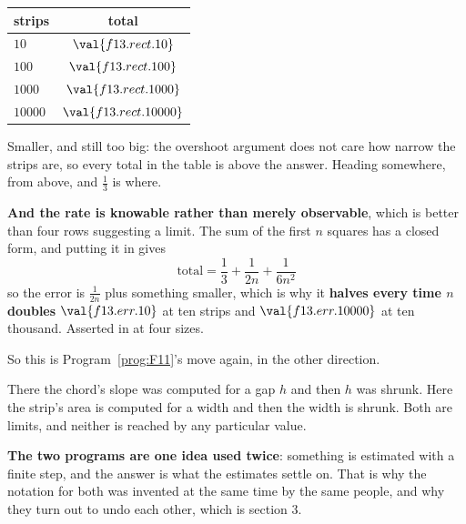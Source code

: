 \begin{fr}
\begin{ansblock}
\begin{center}
%
\begin{tabular}{lc}
\toprule
strips & total \\
\midrule
$\num{10}$ & $\val{f13.rect.10}$ \\
$\num{100}$ & $\val{f13.rect.100}$ \\
$\num{1000}$ & $\val{f13.rect.1000}$ \\
$\num{10000}$ & $\val{f13.rect.10000}$ \\
\bottomrule
\end{tabular}
\end{center}
\end{ansblock}

Smaller, and still too big: the overshoot argument does not care how narrow
the strips are, so every total in the table is above the answer. Heading
somewhere, from above, and $\frac{1}{3}$ is where.

\textbf{And the rate is knowable rather than merely observable}, which is
better than four rows suggesting a limit. The sum of the first $n$ squares has
a closed form, and putting it in gives
\[ \text{total} = \frac{1}{3} + \frac{1}{2n} + \frac{1}{6n^{2}} \]
so the error is $\frac{1}{2n}$ plus something smaller, which is why it
\textbf{halves every time $n$ doubles} \dash{} $\val{f13.err.10}$ at ten strips and
$\val{f13.err.10000}$ at ten thousand. Asserted in
 at four sizes.

\end{fr}

\begin{fr}
So this is Program~\ref{prog:F11}'s move again, in the other direction.

There the chord's slope was computed for a gap $h$ and then $h$ was shrunk.
Here the strip's area is computed for a width and then the width is shrunk.
Both are limits, and neither is reached by any particular value.

\textbf{The two programs are one idea used twice}: something is estimated with
a finite step, and the answer is what the estimates settle on. That is why the
notation for both was invented at the same time by the same people, and why
they turn out to undo each other, which is section 3.
\end{fr}

